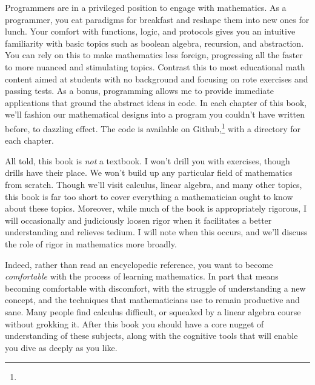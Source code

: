 Programmers are in a privileged position to engage with mathematics.  As a
programmer, you eat paradigms for breakfast and reshape them into new ones for
lunch. Your comfort with functions, logic, and protocols gives you an intuitive
familiarity with basic topics such as boolean algebra, recursion, and
abstraction. You can rely on this to make mathematics less foreign, progressing
all the faster to more nuanced and stimulating topics. Contrast this to most
educational math content aimed at students with no background and focusing on
rote exercises and passing tests.  As a bonus, programming allows me to provide
immediate applications that ground the abstract ideas in code. In each chapter
of this book, we'll fashion our mathematical designs into a program you
couldn't have written before, to dazzling effect. The code is available on
Github,\footnote{\webpageurl} with a directory for each chapter.

All told, this book is \emph{not} a textbook. I won't drill you with exercises,
though drills have their place. We won't build up any particular field of
mathematics from scratch. Though we'll visit calculus, linear algebra, and many
other topics, this book is far too short to cover everything a mathematician
ought to know about these topics. Moreover, while much of the book is
appropriately rigorous, I will occasionally and judiciously loosen rigor when
it facilitates a better understanding and relieves tedium. I will note when
this occurs, and we'll discuss the role of rigor in mathematics more broadly.

Indeed, rather than read an encyclopedic reference, you want to become
\emph{comfortable} with the process of learning mathematics. In part that means
becoming comfortable with discomfort, with the struggle of understanding a new
concept, and the techniques that mathematicians use to remain productive and
sane. Many people find calculus difficult, or squeaked by a linear algebra
course without grokking it. After this book you should have a core nugget of
understanding of these subjects, along with the cognitive tools that will
enable you dive as deeply as you like.

